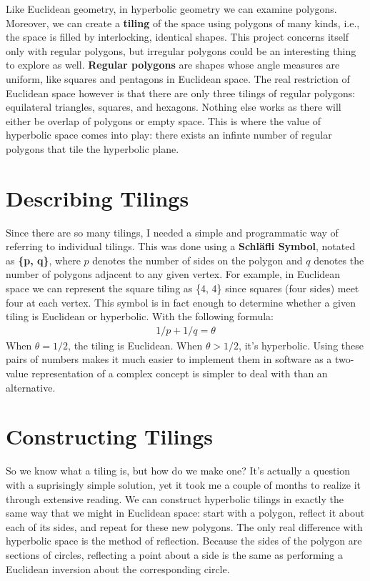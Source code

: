 \documentclass[letterpaper,12pt]{article}
\begin{document}
Like Euclidean geometry, in hyperbolic geometry we can examine polygons. Moreover, we can create a \textbf{tiling} of the space using polygons of many kinds, i.e., the space is filled by interlocking, identical shapes. This project concerns itself only with regular polygons, but irregular polygons could be an interesting thing to explore as well. \textbf{Regular polygons} are shapes whose angle measures are uniform, like squares and pentagons in Euclidean space. The real restriction of Euclidean space however is that there are only three tilings of regular polygons: equilateral triangles, squares, and hexagons. Nothing else works as there will either be overlap of polygons or empty space. This is where the value of hyperbolic space comes into play: there exists an infinte number of regular polygons that tile the hyperbolic plane.

\section*{Describing Tilings}

Since there are so many tilings, I needed a simple and programmatic way of referring to individual tilings. This was done using a \textbf{Schl{\"a}fli Symbol}, notated as \textbf{\{p, q\}}, where $p$ denotes the number of sides on the polygon and $q$ denotes the number of polygons adjacent to any given vertex. For example, in Euclidean space we can represent the square tiling as \{4, 4\} since squares (four sides) meet four at each vertex. This symbol is in fact enough to determine whether a given tiling is Euclidean or hyperbolic. With the following formula:
\begin{gather*}
1/p + 1/q = \theta
\end{gather*}
When $\theta = 1/2$, the tiling is Euclidean. When $\theta > 1/2$, it's hyperbolic. Using these pairs of numbers makes it much easier to implement them in software as a two-value representation of a complex concept is simpler to deal with than an alternative.

\section*{Constructing Tilings}

So we know what a tiling is, but how do we make one? It's actually a question with a suprisingly simple solution, yet it took me a couple of months to realize it through extensive reading. We can construct hyperbolic tilings in exactly the same way that we might in Euclidean space: start with a polygon, reflect it about each of its sides, and repeat for these new polygons. The only real difference with hyperbolic space is the method of reflection. Because the sides of the polygon are sections of circles, reflecting a point about a side is the same as performing a Euclidean inversion about the corresponding circle. 
\end{document}
